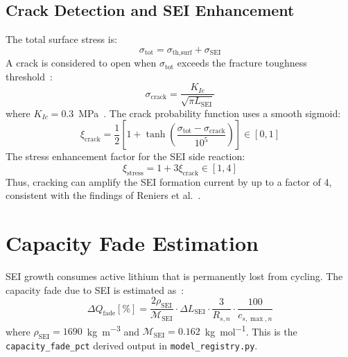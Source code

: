 \subsection{Crack Detection and SEI Enhancement}

The total surface stress is:
\begin{equation}
  \sigma_\text{tot} = \sigma_\text{th,surf} + \sigma_\text{SEI}
  \label{eq:sigma_tot}
\end{equation}
A crack is considered to open when $\sigma_\text{tot}$ exceeds the fracture toughness threshold~\cite{Zhao2011}:
\begin{equation}
  \sigma_\text{crack} = \frac{K_{Ic}}{\sqrt{\pi L_\text{SEI}}}
  \label{eq:crack_threshold}
\end{equation}
where $K_{Ic} = 0.3$~\si{\mega\pascal\sqrt{\meter}}. The crack probability function uses a smooth sigmoid:
\begin{equation}
  \xi_\text{crack} = \frac{1}{2}\left[1 + \tanh\!\left(\frac{\sigma_\text{tot} - \sigma_\text{crack}}{10^5}\right)\right] \in [0,1]
  \label{eq:crack_flag}
\end{equation}
The stress enhancement factor for the SEI side reaction:
\begin{equation}
  \xi_\text{stress} = 1 + 3\xi_\text{crack} \in [1, 4]
  \label{eq:stress_enhancement}
\end{equation}
Thus, cracking can amplify the SEI formation current by up to a factor of 4, consistent with the findings of Reniers et al.~\cite{Reniers2019}.

\section{Capacity Fade Estimation}
\label{sec:capacity_fade}

SEI growth consumes active lithium that is permanently lost from cycling. The capacity fade due to SEI is estimated as~\cite{Pinson2012}:
\begin{equation}
  \Delta Q_\text{fade} [\%] = \frac{2 \rho_\text{SEI}}{\mathcal{M}_\text{SEI}} \cdot \Delta L_\text{SEI} \cdot \frac{3}{R_{s,n}} \cdot \frac{100}{c_{s,\max,n}}
  \label{eq:capacity_fade}
\end{equation}
where $\rho_\text{SEI} = 1690$~\si{\kilogram\per\meter\cubed} and $\mathcal{M}_\text{SEI} = 0.162$~\si{\kilogram\per\mol}. This is the \texttt{capacity\_fade\_pct} derived output in \texttt{model\_registry.py}.
